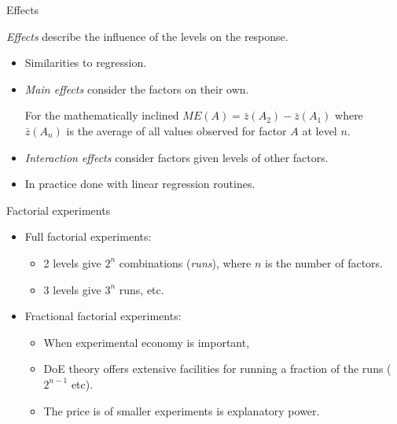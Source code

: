 \documentclass[english,usenames,dvipsnames,aspectratio=169]{beamer}
\begin{document}
\begin{frame}{Effects}

\Large
\emph{Effects} describe the influence of the levels on the response.
\normalsize

\begin{itemize}
\item Similarities to regression.
\item \emph{Main effects} consider the factors on their own.
\begin{block}{For the mathematically inclined}
  $ME(A) = \bar{z}(A_2) - \bar{z}(A_1)$ where $\bar{z}(A_n)$ is the
  average of all values observed for factor $A$ at level $n$.
\end{block}



\item \emph{Interaction effects} consider factors given levels of
  other factors.
\item In practice done with linear regression routines.
\end{itemize}

\end{frame}


\begin{frame}{Factorial experiments}

  \begin{itemize}
  \item Full factorial experiments:
    \begin{itemize}
    \item 2 levels give $2^n$ combinations (\emph{runs}), where $n$ is
      the number of factors.
    \item 3 levels give $3^n$ runs, etc.
    \end{itemize}
  \item Fractional factorial experiments:

    \begin{itemize}
    \item When experimental economy is important,
    \item DoE theory offers extensive facilities for running a
      fraction of the runs ($2^{n-1}$ etc).
    \item The price is of smaller experiments is explanatory power.
    \end{itemize}
  \end{itemize}
\end{frame}
\end{document}
